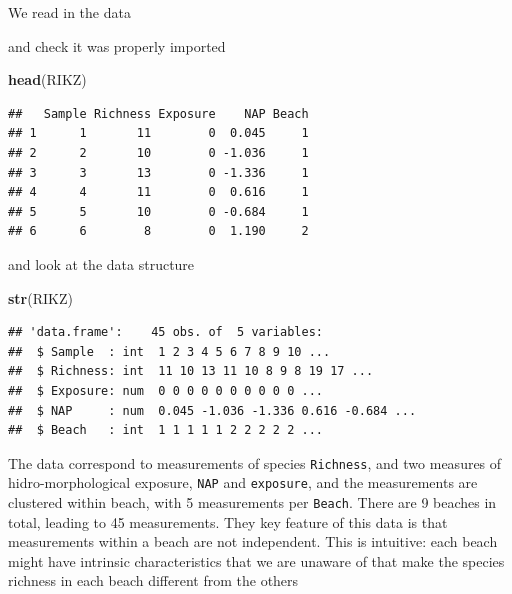 \documentclass[
]{book}
\newenvironment{Shaded}{\begin{snugshade}}{\end{snugshade}}
\newcommand{\CommentTok}[1]{\textcolor[rgb]{0.56,0.35,0.01}{\textit{#1}}}
\newcommand{\DecValTok}[1]{\textcolor[rgb]{0.00,0.00,0.81}{#1}}
\newcommand{\FunctionTok}[1]{\textcolor[rgb]{0.13,0.29,0.53}{\textbf{#1}}}
\newcommand{\NormalTok}[1]{#1}
\newcommand{\OtherTok}[1]{\textcolor[rgb]{0.56,0.35,0.01}{#1}}
\newcommand{\SpecialCharTok}[1]{\textcolor[rgb]{0.81,0.36,0.00}{\textbf{#1}}}
\newcommand{\StringTok}[1]{\textcolor[rgb]{0.31,0.60,0.02}{#1}}
\begin{document}
We read in the data

\begin{Shaded}
\end{Shaded}

and check it was properly imported

\begin{Shaded}
\begin{Highlighting}[]
\FunctionTok{head}\NormalTok{(RIKZ)}
\end{Highlighting}
\end{Shaded}

\begin{verbatim}
##   Sample Richness Exposure    NAP Beach
## 1      1       11        0  0.045     1
## 2      2       10        0 -1.036     1
## 3      3       13        0 -1.336     1
## 4      4       11        0  0.616     1
## 5      5       10        0 -0.684     1
## 6      6        8        0  1.190     2
\end{verbatim}

and look at the data structure

\begin{Shaded}
\begin{Highlighting}[]
\FunctionTok{str}\NormalTok{(RIKZ)}
\end{Highlighting}
\end{Shaded}

\begin{verbatim}
## 'data.frame':    45 obs. of  5 variables:
##  $ Sample  : int  1 2 3 4 5 6 7 8 9 10 ...
##  $ Richness: int  11 10 13 11 10 8 9 8 19 17 ...
##  $ Exposure: num  0 0 0 0 0 0 0 0 0 0 ...
##  $ NAP     : num  0.045 -1.036 -1.336 0.616 -0.684 ...
##  $ Beach   : int  1 1 1 1 1 2 2 2 2 2 ...
\end{verbatim}

The data correspond to measurements of species \texttt{Richness}, and two measures of hidro-morphological exposure, \texttt{NAP} and \texttt{exposure}, and the measurements are clustered within beach, with 5 measurements per \texttt{Beach}. There are 9 beaches in total, leading to 45 measurements. They key feature of this data is that measurements within a beach are not independent. This is intuitive: each beach might have intrinsic characteristics that we are unaware of that make the species richness in each beach different from the others
\end{document}

